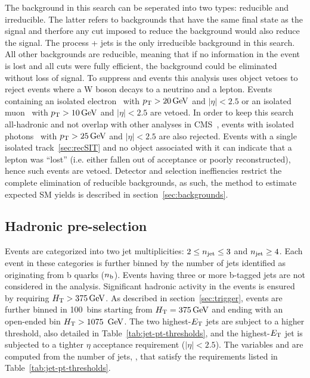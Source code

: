 The background in this search can be seperated into two types: 
reducible and irreducible. The latter refers to backgrounds that 
have the same final state as the signal and therfore any cut imposed 
to reduce the background would also reduce the signal. The process 
\znunu + jets is the only irreducible background in this search. 
All other backgrounds are reducible, meaning that if no information 
in the event is lost and all cuts were fully efficient, the background 
could be eliminated without loss of signal. To suppress \wj and \ttbar
events this analysis uses object vetoes to reject events where a W boson 
decays to a neutrino and a lepton. Events containing 
an isolated electron~\cite{PAS-EGM-10-004} with $p_{\mathrm{T}} > 20\,\text{Ge\hspace{-.08em}V}$ 
and $|\eta| < 2.5$ or an isolated muon~\cite{PAS-MUO-10-002}
with $p_{\mathrm{T}} > 10\,\text{Ge\hspace{-.08em}V}$ and $|\eta| < 2.5$ are vetoed. In order to keep this 
search all-hadronic and not overlap with other analyses in 
CMS~\cite{CMS-PAS-SUS-14-008,photon7TeV}, events with isolated 
photons~\cite{PAS-EGM-10-006} with $p_{\mathrm{T}} > 25\,\text{Ge\hspace{-.08em}V}$ 
and $|\eta| < 2.5$ are also rejected. Events with a single isolated 
track~\ref{sec:recSIT} and no object associated with it can indicate that
a lepton was ``lost'' (i.e. either fallen out of acceptance or poorly 
reconstructed), hence such events are vetoed. Detector and selection 
ineffiencies restrict the complete elimination of reducible backgrounds, 
as such, the method to estimate expected SM yields is described 
in section~\ref{sec:backgrounds}.

\subsection{Hadronic pre-selection}

Events are categorized into two jet multiplicities: $2 \leq n_{\text{jet}} \leq 3$ and 
$n_{\text{jet}} \geq 4$.  Each event in these categories is further binned by the number
of jets identified as originating from b quarks ($n_{\text{b}}$). Events having 
three or more b-tagged jets are not considered in the analysis.      
Significant hadronic activity in the events is ensured by requiring
$\mbox{$H_\text{T}$} > 375\,\text{Ge\hspace{-.08em}V}$. As described in section~\ref{sec:trigger}, events are further
binned in 100~\gev bins starting from $\mbox{$H_\text{T}$} = 375\,\text{Ge\hspace{-.08em}V}$ and ending with an open-ended
bin $\mbox{$H_\text{T}$} > 1075~\,\text{Ge\hspace{-.08em}V}$. The two highest-${E_{\text T}}$ jets are subject to a 
higher threshold, also detailed in
Table~\ref{tab:jet-pt-thresholds}, and the highest-${E_{\text T}}$ jet is
subjected to a tighter $\eta$ acceptance requirement ($|\eta| <
2.5$). The variables \scalht and \mht are computed from the number of
jets, \njet, that satisfy the \Et requirements listed in
Table~\ref{tab:jet-pt-thresholds}. 


